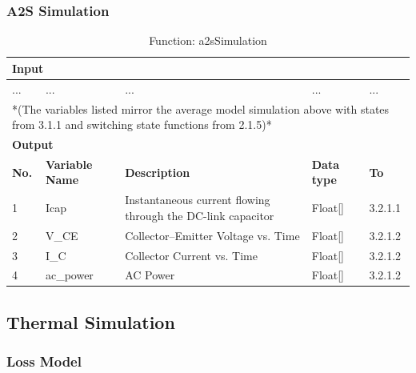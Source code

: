 \documentclass{article}
\begin{document}
\subsubsection{A2S Simulation}
\begin{table}[h]
\centering
\caption{Function: a2sSimulation}
\begin{tabular}{|l|l|p{6cm}|l|l|}
\hline
\multicolumn{5}{|l|}{\textbf{Input}} \\ \hline
... & ... & ... & ... & ... \\ \hline
\multicolumn{5}{|p{15cm}|}{*(The variables listed mirror the average model simulation above with states from 3.1.1 and switching state functions from 2.1.5)*} \\ \hline
\multicolumn{5}{|l|}{\textbf{Output}} \\ \hline
\textbf{No.} & \textbf{Variable Name} & \textbf{Description} & \textbf{Data type} & \textbf{To} \\ \hline
1 & Icap & Instantaneous current flowing through the DC-link capacitor & Float[] & 3.2.1.1 \\ \hline
2 & V\_CE & Collector–Emitter Voltage vs. Time & Float[] & 3.2.1.2 \\ \hline
3 & I\_C & Collector Current vs. Time & Float[] & 3.2.1.2 \\ \hline
4 & ac\_power & AC Power & Float[] & 3.2.1.2 \\ \hline
\end{tabular}
\end{table}

\subsection{Thermal Simulation}
\subsubsection{Loss Model}
\end{document}
